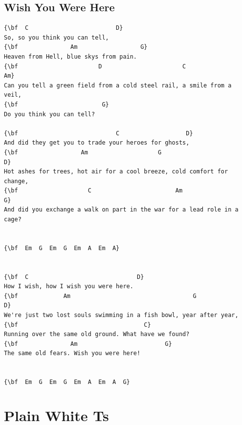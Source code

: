 \documentclass[a4paper]{article}
\begin{document}
\subsection{Wish You Were Here}
\begin{Verbatim}[commandchars=\\\{\}]
{\bf  C                         D}
So, so you think you can tell,
{\bf               Am                  G}
Heaven from Hell, blue skys from pain.
{\bf                       D                       C                    Am}
Can you tell a green field from a cold steel rail, a smile from a veil,
{\bf                        G}
Do you think you can tell?

{\bf                            C                   D}
And did they get you to trade your heroes for ghosts,
{\bf                  Am                    G                             D}
Hot ashes for trees, hot air for a cool breeze, cold comfort for change,
{\bf                    C                        Am                         G}
And did you exchange a walk on part in the war for a lead role in a cage?


{\bf  Em  G  Em  G  Em  A  Em  A}


{\bf  C                               D}
How I wish, how I wish you were here.
{\bf             Am                                   G                    D}
We're just two lost souls swimming in a fish bowl, year after year,
{\bf                                    C}
Running over the same old ground. What have we found?
{\bf               Am                         G}
The same old fears. Wish you were here!


{\bf  Em  G  Em  G  Em  A  Em  A  G}

\end{Verbatim}
\newpage
\section{Plain White Ts}
\end{document}
